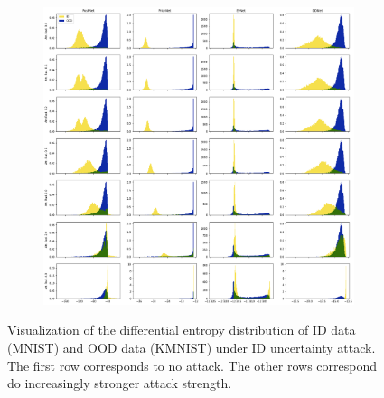 \begin{figure}[ht!]
    \centering
        \begin{subfigure}[t]{1.0\textwidth}
        \centering
        \includegraphics[width=0.99 \textwidth]{sections/008_icml2021/eval/unc_dist_unc_id_mnist_c.png}
    \end{subfigure}%
    \caption{Visualization of the differential entropy distribution of ID data (MNIST) and OOD data (KMNIST) under ID uncertainty attack. The first row corresponds to no attack. The other rows correspond do increasingly stronger attack strength.}
    \label{fig:attaked_samples_idood_mnist_2}
	\vspace{-.5cm}
\end{figure}






